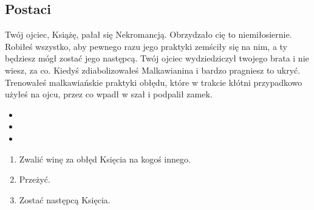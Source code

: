 	\subsection{Postaci}
	\label{sec:characters}
			{}{
			Twój ojciec, Książę, pałał się Nekromancją.
			Obrzydzało cię to niemiłosiernie.
			Robiłeś wszystko, aby pewnego razu jego praktyki zemściły się na nim, a ty będziesz mógł zostać jego następcą.
			Twój ojciec wydziedziczył twojego brata i nie wiesz, za co.
			Kiedyś zdiabolizowałeś Malkawianina i bardzo pragniesz to ukryć.
			Trenowałeś malkawiańskie praktyki obłędu, które w trakcie kłótni przypadkowo użyłeś na ojcu, przez co wpadł w szał i podpalił zamek.}
			{
				\begin{itemize}[noitemsep]
					\item {}
					\item {}
					\item {}
				\end{itemize}

			}{
				\begin{enumerate}[noitemsep]
					\item Zwalić winę za obłęd Księcia na kogoś innego.
					\item Przeżyć.
					\item Zostać następcą Księcia.
				\end{enumerate}
			}
			{}
			{
				\larplistall{}
				\larplistblood{}
				\larplistvampire{}
			}
			
